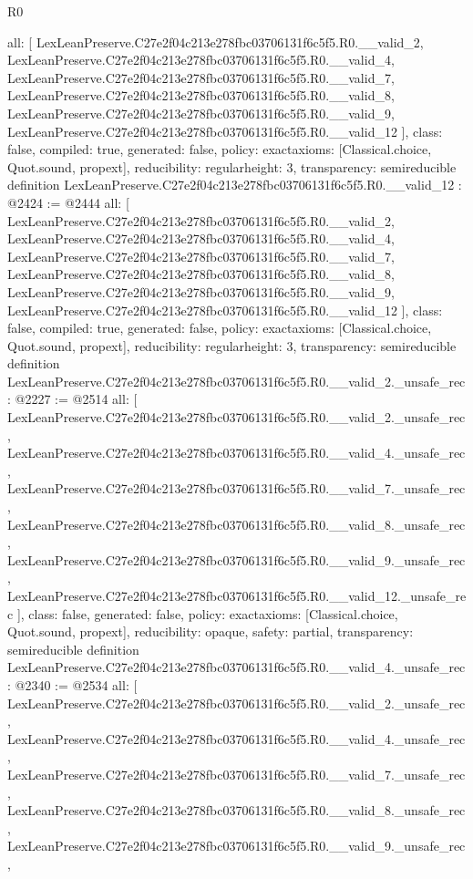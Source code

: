 \begin{lexlean}{R0}
\begin{coremodule}
{  all: [
    LexLeanPreserve.C27e2f04c213e278fbc03706131f6c5f5.R0.__valid_2,
    LexLeanPreserve.C27e2f04c213e278fbc03706131f6c5f5.R0.__valid_4,
    LexLeanPreserve.C27e2f04c213e278fbc03706131f6c5f5.R0.__valid_7,
    LexLeanPreserve.C27e2f04c213e278fbc03706131f6c5f5.R0.__valid_8,
    LexLeanPreserve.C27e2f04c213e278fbc03706131f6c5f5.R0.__valid_9,
    LexLeanPreserve.C27e2f04c213e278fbc03706131f6c5f5.R0.__valid_12
  ],
  class: false,
  compiled: true,
  generated: false,
  policy: exact{axioms: [Classical.choice, Quot.sound, propext]},
  reducibility: regular{height: 3},
  transparency: semireducible
}
definition LexLeanPreserve.C27e2f04c213e278fbc03706131f6c5f5.R0.__valid_12 : @2424 := @2444 {
  all: [
    LexLeanPreserve.C27e2f04c213e278fbc03706131f6c5f5.R0.__valid_2,
    LexLeanPreserve.C27e2f04c213e278fbc03706131f6c5f5.R0.__valid_4,
    LexLeanPreserve.C27e2f04c213e278fbc03706131f6c5f5.R0.__valid_7,
    LexLeanPreserve.C27e2f04c213e278fbc03706131f6c5f5.R0.__valid_8,
    LexLeanPreserve.C27e2f04c213e278fbc03706131f6c5f5.R0.__valid_9,
    LexLeanPreserve.C27e2f04c213e278fbc03706131f6c5f5.R0.__valid_12
  ],
  class: false,
  compiled: true,
  generated: false,
  policy: exact{axioms: [Classical.choice, Quot.sound, propext]},
  reducibility: regular{height: 3},
  transparency: semireducible
}
definition LexLeanPreserve.C27e2f04c213e278fbc03706131f6c5f5.R0.__valid_2._unsafe_rec : @2227 := @2514 {
  all: [
    LexLeanPreserve.C27e2f04c213e278fbc03706131f6c5f5.R0.__valid_2._unsafe_rec,
    LexLeanPreserve.C27e2f04c213e278fbc03706131f6c5f5.R0.__valid_4._unsafe_rec,
    LexLeanPreserve.C27e2f04c213e278fbc03706131f6c5f5.R0.__valid_7._unsafe_rec,
    LexLeanPreserve.C27e2f04c213e278fbc03706131f6c5f5.R0.__valid_8._unsafe_rec,
    LexLeanPreserve.C27e2f04c213e278fbc03706131f6c5f5.R0.__valid_9._unsafe_rec,
    LexLeanPreserve.C27e2f04c213e278fbc03706131f6c5f5.R0.__valid_12._unsafe_rec
  ],
  class: false,
  generated: false,
  policy: exact{axioms: [Classical.choice, Quot.sound, propext]},
  reducibility: opaque{},
  safety: partial,
  transparency: semireducible
}
definition LexLeanPreserve.C27e2f04c213e278fbc03706131f6c5f5.R0.__valid_4._unsafe_rec : @2340 := @2534 {
  all: [
    LexLeanPreserve.C27e2f04c213e278fbc03706131f6c5f5.R0.__valid_2._unsafe_rec,
    LexLeanPreserve.C27e2f04c213e278fbc03706131f6c5f5.R0.__valid_4._unsafe_rec,
    LexLeanPreserve.C27e2f04c213e278fbc03706131f6c5f5.R0.__valid_7._unsafe_rec,
    LexLeanPreserve.C27e2f04c213e278fbc03706131f6c5f5.R0.__valid_8._unsafe_rec,
    LexLeanPreserve.C27e2f04c213e278fbc03706131f6c5f5.R0.__valid_9._unsafe_rec,
}
\end{coremodule}
\end{lexlean}
